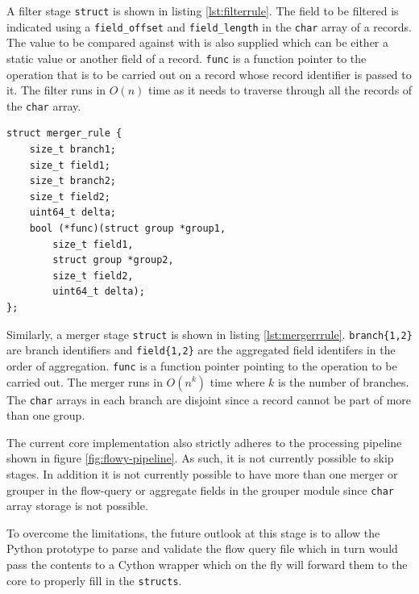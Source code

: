 A filter stage \texttt{struct} is shown in listing \ref{lst:filterrule}. The field to be filtered is indicated using a \texttt{field\_offset} and \texttt{field\_length} in the \texttt{char} array of a records. The value to be compared against with is also supplied which can be either a static value or another field of a record. \texttt{func} is a function pointer to the operation that is to be carried out on a record whose record identifier is passed to it. The filter runs in $O(n)$ time as it needs to traverse through all the records of the \texttt{char} array.

\begin{lstlisting}
struct merger_rule {
	size_t branch1;
	size_t field1;
	size_t branch2;
	size_t field2;
	uint64_t delta;
	bool (*func)(struct group *group1,
		size_t field1,
		struct group *group2,
		size_t field2,
		uint64_t delta);
};
\end{lstlisting}

Similarly, a merger stage \texttt{struct} is shown in listing \ref{lst:mergerrrule}. \texttt{branch\{1,2\}} are branch identifiers and \texttt{field\{1,2\}} are the aggregated field identifers in the order of aggregation. \texttt{func} is a function pointer pointing to the operation to be carried out. The merger runs in $O(n^k)$ time where $k$ is the number of branches. The \texttt{char} arrays in each branch are disjoint since a record cannot be part of more than one group.

The current core implementation also strictly adheres to the processing pipeline shown in figure \ref{fig:flowy-pipeline}. As such, it is not currently possible to skip stages. In addition it is not currently possible to have more than one merger or grouper in the flow-query or aggregate fields in the grouper module since \texttt{char} array storage is not possible. 

To overcome the limitations, the future outlook at this stage is to allow the Python prototype to parse and validate the flow query file which in turn would pass the contents to a Cython wrapper which on the fly will forward them to the core to properly fill in the \texttt{structs}. 

